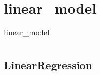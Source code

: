 \chapter{linear\_model\label{linearmodel}}
\begin{table}
    \centering
    \caption{linear\_model}
    \begin{tabular}{l}
        \hline
        \nameref{LinearRegression} \\
        \hline
    \end{tabular}
\end{table}
\section{LinearRegression\label{LinearRegression}}